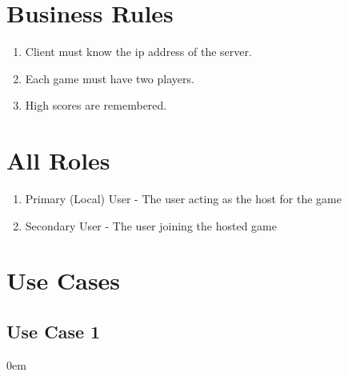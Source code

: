 \documentclass[titlepage]{article}
\begin{document}
	\section{Business Rules}
	
	\begin{enumerate}
		\item Client must know the ip address of the server.
		\item Each game must have two players.
		\item High scores are remembered.
	\end{enumerate}

	\section{All Roles}
	
	\begin{enumerate}
		\item Primary (Local) User - The user acting as the host for the game
		\item Secondary User - The user joining the hosted game
	\end{enumerate}
	
	\section{Use Cases}
	\subsection{Use Case 1}
	\itemsep0em 
\end{document}
